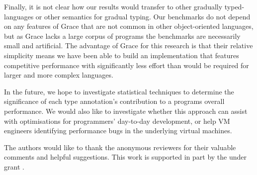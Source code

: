 \documentclass[sigplan,screen]{acmart}
\begin{document}
Finally, it is not clear how our results would transfer
to other gradually typed-languages or other semantics for gradual typing.
Our benchmarks do not depend on any features of Grace
that are not common in other object-oriented
languages, but as Grace lacks a large corpus of programs the
benchmarks are necessarily small and artificial.
The advantage of Grace for this research is
that their relative simplicity means we have been able to build an
implementation that features competitive performance with significantly less
effort than would be required for larger and more complex languages.

In the future, we hope to investigate statistical techniques to
determine the significance of each type annotation's contribution to a
programs overall performance. We would also like to investigate 
whether this approach can assist with optimisations for programmers' day-to-day  development, or help VM engineers identifying performance bugs in the underlying virtual machines.

\begin{acks}
The authors would like to thank the anonymous reviewers for their
valuable comments and helpful suggestions. This work is supported
in part by the  under grant .
\end{acks}


\end{document}
